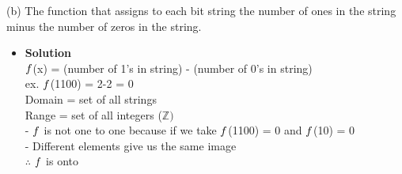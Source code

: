 \documentclass[11pt]{article}
\begin{document}
\begin{enumerate}

\begin{flushleft}
\end{flushleft}


\large (b) The function that assigns to each bit string the number of ones in the string minus the number
of zeros in the string.\\

\begin{itemize}
\item \textbf{Solution}\\
\large $\mathnormal{f}$(x) = (number of 1's in string) - (number of 0's in string)\\
\large ex. $\mathnormal{f}$(1100) = 2-2 = 0\\
\large Domain = set of all strings\\
\large Range = set of all integers ($\mathbb{Z})$\\
\large - $\mathnormal{f}$ is not one to one because
if we take  $\mathnormal{f}$(1100) = 0 and $\mathnormal{f}$(10) = 0\\
\large - Different elements give us the same image\\
\large $\therefore$ $\mathnormal{f}$ is onto\\

\end {itemize}
\end {enumerate}
\end{document}
